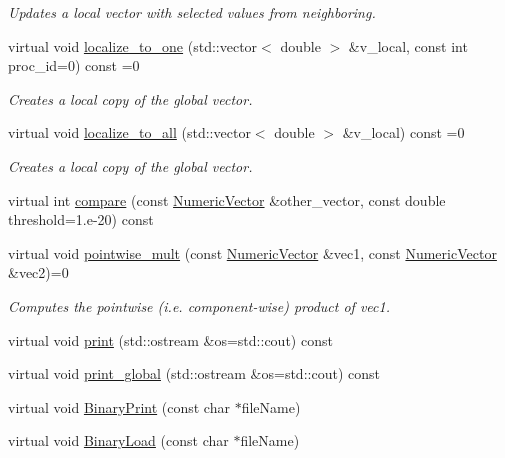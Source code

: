 \begin{DoxyCompactItemize}
\begin{DoxyCompactList}\small\item\em Updates a local vector with selected values from neighboring. \end{DoxyCompactList}\item 
virtual void \mbox{\hyperlink{classfemus_1_1_numeric_vector_a79162ba04fabd23806f9bd4ac360e59c}{localize\+\_\+to\+\_\+one}} (std\+::vector$<$ double $>$ \&v\+\_\+local, const int proc\+\_\+id=0) const =0
\begin{DoxyCompactList}\small\item\em Creates a local copy of the global vector. \end{DoxyCompactList}\item 
virtual void \mbox{\hyperlink{classfemus_1_1_numeric_vector_a912461feae9b5a74418e26da08d1fca3}{localize\+\_\+to\+\_\+all}} (std\+::vector$<$ double $>$ \&v\+\_\+local) const =0
\begin{DoxyCompactList}\small\item\em Creates a local copy of the global vector. \end{DoxyCompactList}\item 
virtual int \mbox{\hyperlink{classfemus_1_1_numeric_vector_a692068ac78adf8745fa5ba7a2efd7189}{compare}} (const \mbox{\hyperlink{classfemus_1_1_numeric_vector}{Numeric\+Vector}} \&other\+\_\+vector, const double threshold=1.e-\/20) const
\item 
virtual void \mbox{\hyperlink{classfemus_1_1_numeric_vector_a03fe33034db2031592e9714d6b091503}{pointwise\+\_\+mult}} (const \mbox{\hyperlink{classfemus_1_1_numeric_vector}{Numeric\+Vector}} \&vec1, const \mbox{\hyperlink{classfemus_1_1_numeric_vector}{Numeric\+Vector}} \&vec2)=0
\begin{DoxyCompactList}\small\item\em Computes the pointwise (i.\+e. component-\/wise) product of {\ttfamily vec1}. \end{DoxyCompactList}\item 
virtual void \mbox{\hyperlink{classfemus_1_1_numeric_vector_a747d2a62dbad91f7b04434a67c8636f4}{print}} (std\+::ostream \&os=std\+::cout) const
\item 
virtual void \mbox{\hyperlink{classfemus_1_1_numeric_vector_aec17991ed847c6b52b055a7cd737dae1}{print\+\_\+global}} (std\+::ostream \&os=std\+::cout) const
\item 
virtual void \mbox{\hyperlink{classfemus_1_1_numeric_vector_af87a4526918cc4b5a825f6ff9dd7616d}{Binary\+Print}} (const char $\ast$file\+Name)
\item 
virtual void \mbox{\hyperlink{classfemus_1_1_numeric_vector_ad18ea02ddcee43fb8071b5125f4c1b5e}{Binary\+Load}} (const char $\ast$file\+Name)
\end{DoxyCompactItemize}

